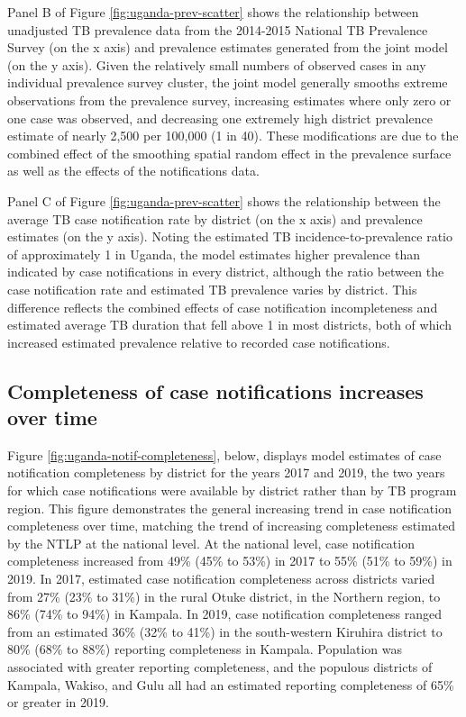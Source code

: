 \documentclass[
]{report}
\begin{document}
Panel B of Figure \ref{fig:uganda-prev-scatter} shows the relationship between unadjusted TB prevalence data from the 2014-2015 National TB Prevalence Survey (on the x axis) and prevalence estimates generated from the joint model (on the y axis). Given the relatively small numbers of observed cases in any individual prevalence survey cluster, the joint model generally smooths extreme observations from the prevalence survey, increasing estimates where only zero or one case was observed, and decreasing one extremely high district prevalence estimate of nearly 2,500 per 100,000 (1 in 40). These modifications are due to the combined effect of the smoothing spatial random effect in the prevalence surface as well as the effects of the notifications data.

Panel C of Figure \ref{fig:uganda-prev-scatter} shows the relationship between the average TB case notification rate by district (on the x axis) and prevalence estimates (on the y axis). Noting the estimated TB incidence-to-prevalence ratio of approximately 1 in Uganda, the model estimates higher prevalence than indicated by case notifications in every district, although the ratio between the case notification rate and estimated TB prevalence varies by district. This difference reflects the combined effects of case notification incompleteness and estimated average TB duration that fell above 1 in most districts, both of which increased estimated prevalence relative to recorded case notifications.

\hypertarget{completeness-of-case-notifications-increases-over-time}{%
\subsection{Completeness of case notifications increases over time}\label{completeness-of-case-notifications-increases-over-time}}

Figure \ref{fig:uganda-notif-completeness}, below, displays model estimates of case notification completeness by district for the years 2017 and 2019, the two years for which case notifications were available by district rather than by TB program region. This figure demonstrates the general increasing trend in case notification completeness over time, matching the trend of increasing completeness estimated by the NTLP at the national level.\autocite{UgandaNationalTuberculosisandLeprosyProgramme2020} At the national level, case notification completeness increased from 49\% (45\% to 53\%) in 2017 to 55\% (51\% to 59\%) in 2019. In 2017, estimated case notification completeness across districts varied from 27\% (23\% to 31\%) in the rural Otuke district, in the Northern region, to 86\% (74\% to 94\%) in Kampala. In 2019, case notification completeness ranged from an estimated 36\% (32\% to 41\%) in the south-western Kiruhira district to 80\% (68\% to 88\%) reporting completeness in Kampala. Population was associated with greater reporting completeness, and the populous districts of Kampala, Wakiso, and Gulu all had an estimated reporting completeness of 65\% or greater in 2019.
\end{document}

